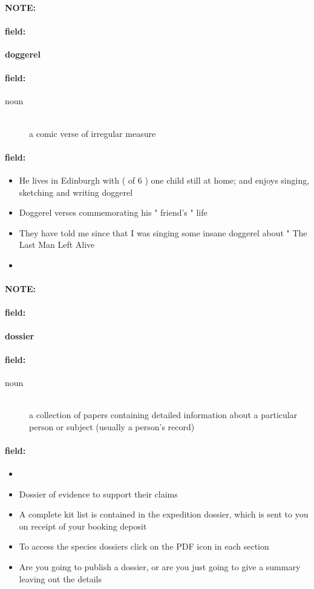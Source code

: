 \documentclass[12pt]{article}
\newenvironment{note}{\paragraph{NOTE:}}{}
\newenvironment{field}{\paragraph{field:}}{}
\begin{document}
\begin{note}
\begin{field}
\textbf{\large doggerel}
\end{field}


\begin{field}
\begin{description}
\item[noun] \hfill \\ 
a comic verse of irregular measure

\end{description}
\end{field}

\begin{field}
\begin{itemize}
\item He lives in Edinburgh with ( of 6 ) one child still at home; and enjoys singing, sketching and writing doggerel
\item Doggerel verses commemorating his " friend's " life
\item They have told me since that I was singing some insane doggerel about " The Last Man Left Alive
\item 
\end{itemize}
\end{field}
\end{note}
\begin{note}
\begin{field}
\textbf{\large dossier}
\end{field}


\begin{field}
\begin{description}
\item[noun] \hfill \\ 
a collection of papers containing detailed information about a particular person or subject (usually a person's record)

\end{description}
\end{field}

\begin{field}
\begin{itemize}
\item 
\item Dossier of evidence to support their claims
\item A complete kit list is contained in the expedition dossier, which is sent to you on receipt of your booking deposit
\item To access the species dossiers click on the PDF icon in each section
\item Are you going to publish a dossier, or are you just going to give a summary leaving out the details
\end{itemize}
\end{field}
\end{note}
\end{document}
